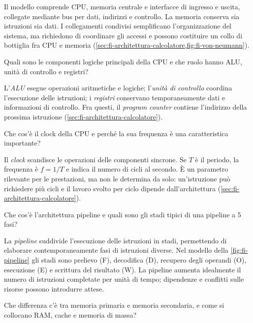Il modello comprende CPU, memoria centrale e interfacce di ingresso
e uscita, collegate mediante bus per dati, indirizzi e controllo.
La memoria conserva sia istruzioni sia dati. I collegamenti condivisi
semplificano l'organizzazione del sistema, ma richiedono di coordinare
gli accessi e possono costituire un collo di bottiglia fra CPU e memoria
(\cref{sec:fi-architettura-calcolatore,fig:fi-von-neumann}).

\begin{exercise}
\label{ex:fi-intro-componenti-cpu}
Quali sono le componenti logiche principali della CPU e che ruolo
hanno ALU, unità di controllo e registri?
\end{exercise}

L'\emph{ALU} esegue operazioni aritmetiche e logiche; l'\emph{unità
di controllo} coordina l'esecuzione delle istruzioni; i \emph{registri}
conservano temporaneamente dati e informazioni di controllo. Fra
questi, il \emph{program counter} contiene l'indirizzo della prossima
istruzione (\cref{sec:fi-architettura-calcolatore}).

\begin{exercise}
\label{ex:fi-intro-clock-cpu}
Che cos'è il clock della CPU e perché la sua frequenza è una
caratteristica importante?
\end{exercise}

Il \emph{clock} scandisce le operazioni delle componenti sincrone.
Se \(T\) è il periodo, la frequenza è \(f=1/T\) e indica il numero
di cicli al secondo. È un parametro rilevante per le prestazioni,
ma non le determina da solo: un'istruzione può richiedere più cicli
e il lavoro svolto per ciclo dipende dall'architettura
(\cref{sec:fi-architettura-calcolatore}).

\begin{exercise}
\label{ex:fi-intro-pipeline}
Che cos'è l'architettura pipeline e quali sono gli stadi tipici
di una pipeline a 5 fasi?
\end{exercise}

La \emph{pipeline} suddivide l'esecuzione delle istruzioni in stadi,
permettendo di elaborare contemporaneamente fasi di istruzioni diverse.
Nel modello della \cref{fig:fi-pipeline} gli stadi sono prelievo (F),
decodifica (D), recupero degli operandi (O), esecuzione (E) e
scrittura del risultato (W). La pipeline aumenta idealmente il numero
di istruzioni completate per unità di tempo; dipendenze e conflitti
sulle risorse possono introdurre attese.

\begin{exercise}
\label{ex:fi-intro-memoria-gerarchia}
Che differenza c'è tra memoria primaria e memoria secondaria, e come
si collocano RAM, cache e memoria di massa?
\end{exercise}

